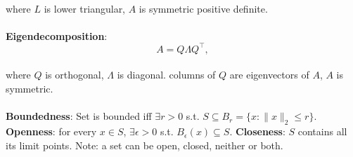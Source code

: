 {\begin{theorem}[]{}
    \vspace{-5pt}\\
    where $L$ is lower triangular, $A$ is symmetric positive definite.\\
    \vspace{-5pt}\\
    \textbf{Eigendecomposition}:
    \vspace{-5pt}\\
    \begin{equation*}
        A = Q\Lambda Q^\top,
    \end{equation*}
    \vspace{-5pt}\\
    where $Q$ is orthogonal, $\Lambda$ is diagonal. columns of $Q$ are eigenvectors of $A$, $A$ is symmetric.\\
    \vspace{-5pt}\\
    \textbf{Boundedness}:
    Set is bounded iff $\exists r > 0$ s.t. $S \subseteq B_r = \{x: \|x\|_2 \leq r\}$.
    \textbf{Openness}:
    for every $x \in S$, $\exists \epsilon > 0$ s.t. $B_\epsilon(x) \subseteq S$.
    \textbf{Closeness}:
    $S$ contains all its limit points. Note: a set can be open, closed, neither or both.
\end{theorem}
}